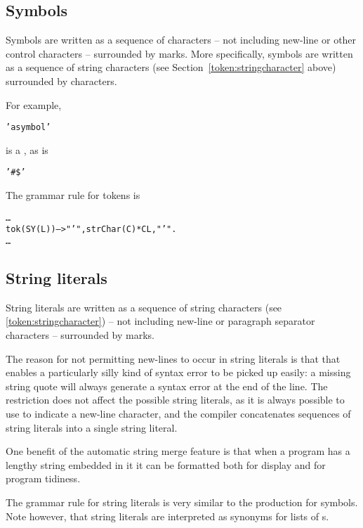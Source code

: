 \subsection{Symbols}
\label{token:symbol}

Symbols are written as a sequence of characters -- not including new-line or other control characters -- surrounded by  marks. More specifically, symbols are written as a sequence of string characters (see Section~\ref{token:stringcharacter} above) surrounded by  characters.

For example,
\begin{alltt}
'a symbol'
\end{alltt}
is a , as is
\begin{alltt}
'#\$'
\end{alltt}
The grammar rule for  tokens is
\begin{alltt}
\ldots
tok(SY(L)) --> "\bsl{}'", strChar(C)*C\uphat{}L,"\bsl{}'".
\ldots{}
\end{alltt}

\subsection{String literals}
\label{token:string}

String literals are written as a sequence of string characters (see \ref{token:stringcharacter}) -- not including new-line or paragraph separator characters -- surrounded by  marks.

\begin{aside}
The reason for not permitting new-lines to occur in string literals is that that enables a particularly silly kind of syntax error to be picked up easily: a missing string quote will always generate a syntax error at the end of the line. The restriction does not affect the possible string literals, as it is always possible to use  to indicate a new-line character, and the \go compiler concatenates sequences of string literals into a single string literal.

One benefit of the automatic string merge feature is that when a program has a lengthy string embedded in it it can be formatted both for display and for program tidiness.
\end{aside}

The grammar rule for string literals is very similar to the production for symbols. Note however, that string literals are interpreted as synonyms for lists of s.

